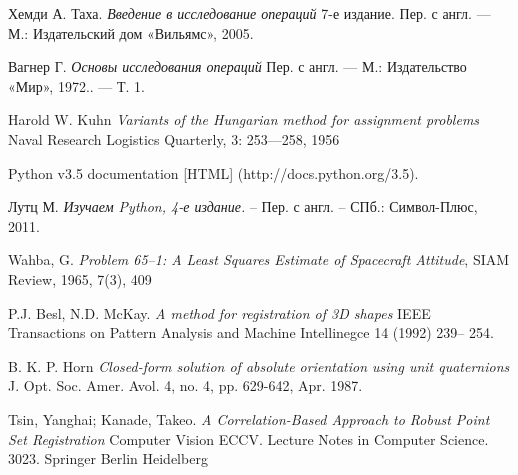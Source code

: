 \begin{thebibliography}{00}
 Хемди А. Таха.
\emph{Введение в исследование операций} 7-е издание. Пер. с англ. — М.: Издательский дом «Вильямс», 2005.

 Вагнер Г.
\emph{Основы исследования операций} Пер. с англ. — М.: Издательство «Мир», 1972.. — Т. 1.

 Harold W. Kuhn
\emph{Variants of the Hungarian method for assignment problems} Naval Research Logistics Quarterly, 3: 253—258, 1956

 Python v3.5 documentation
[HTML] (http://docs.python.org/3.5).

 Лутц М.
\emph{Изучаем Python, 4-е издание.} – Пер. с англ. – СПб.: Символ-Плюс, 2011.

 Wahba, G. 
\emph{Problem 65–1: A Least Squares Estimate of Spacecraft Attitude}, SIAM Review, 1965, 7(3), 409


 P.J. Besl, N.D. McKay.
\emph{A method for registration of 3D shapes} IEEE Transactions on Pattern Analysis and Machine Intellinegce 14 (1992) 239– 254.

 B. K. P. Horn 
\emph{Closed-form solution of absolute orientation using unit quaternions} J. Opt. Soc. Amer. Avol. 4, no. 4, pp. 629-642, Apr. 1987.

 Tsin, Yanghai; Kanade, Takeo.
\emph{A Correlation-Based Approach to Robust Point Set Registration} Computer Vision ECCV. Lecture Notes in Computer Science. 3023. Springer Berlin Heidelberg


\end{thebibliography}